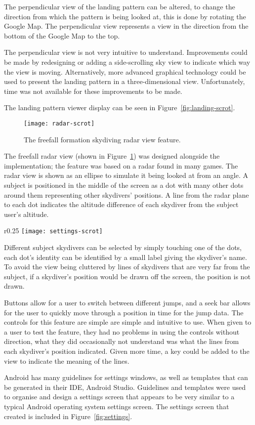 The perpendicular view of the landing pattern can be altered, to change the direction from which the pattern is being looked at, this is done by rotating the Google Map. The perpendicular view represents a view in the direction from the bottom of the Google Map to the top.

The perpendicular view is not very intuitive to understand. Improvements could be made by redesigning or adding a side-scrolling sky view to indicate which way the view is moving. Alternatively, more advanced graphical technology could be used to present the landing pattern in a three-dimensional view. Unfortunately, time was not available for these improvements to be made.

The landing pattern viewer display can be seen in Figure~\ref{fig:landing-scrot}.

\begin{figure}[!t]
  \centering
  \texttt{[image: radar-scrot]}
  \caption{The freefall formation skydiving radar view feature.}\label{fig:radar}
\end{figure}

The freefall radar view (shown in Figure~\ref{fig:radar}) was designed alongside the implementation; the feature was based on a radar found in many games. The radar view is shown as an ellipse to simulate it being looked at from an angle. A subject is positioned in the middle of the screen as a dot with many other dots around them representing other skydivers' positions. A line from the radar plane to each dot indicates the altitude difference of each skydiver from the subject user's altitude.

\begin{wrapfigure}[19]{r}{0.25\textwidth}
  \centering
  \texttt{[image: settings-scrot]}
  \caption{The settings screen for the app.}\label{fig:settings}
\end{wrapfigure}

Different subject skydivers can be selected by simply touching one of the dots, each dot's identity can be identified by a small label giving the skydiver's name. To avoid the view being cluttered by lines of skydivers that are very far from the subject, if a skydiver's position would be drawn off the screen, the position is not drawn.

Buttons allow for a user to switch between different jumps, and a seek bar allows for the user to quickly move through a position in time for the jump data. The controls for this feature are simple are simple and intuitive to use. When given to a user to test the feature, they had no problems in using the controls without direction, what they did occasionally not understand was what the lines from each skydiver's position indicated. Given more time, a key could be added to the view to indicate the meaning of the lines.

Android has many guidelines for settings windows, as well as templates that can be generated in their IDE, Android Studio. Guidelines and templates were used to organise and design a settings screen that appears to be very similar to a typical Android operating system settings screen.
The settings screen that created is included in Figure~\ref{fig:settings}.
